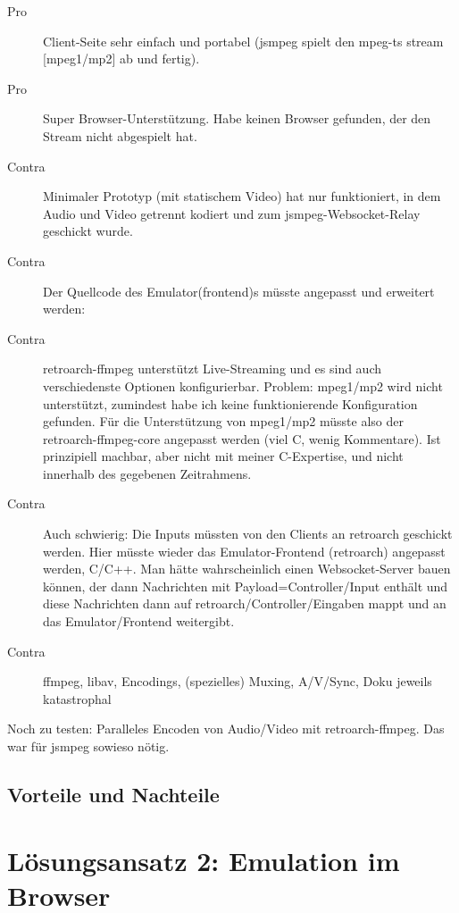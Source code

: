 \begin{description}
    \item [Pro] Client-Seite sehr einfach und portabel (jsmpeg spielt den mpeg-ts stream [mpeg1/mp2] ab und fertig).
    \item [Pro] Super Browser-Unterstützung. Habe keinen Browser gefunden, der den Stream nicht abgespielt hat.
    \item [Contra]  Minimaler Prototyp (mit statischem Video) hat nur funktioniert, in dem Audio und Video getrennt kodiert und zum jsmpeg-Websocket-Relay geschickt wurde.
\item [Contra] Der Quellcode des Emulator(frontend)s müsste angepasst und erweitert werden:
    \item [Contra] retroarch-ffmpeg unterstützt Live-Streaming und es sind auch verschiedenste Optionen konfigurierbar. Problem: mpeg1/mp2 wird nicht unterstützt, zumindest habe ich keine funktionierende Konfiguration gefunden. Für die Unterstützung von mpeg1/mp2 müsste also der retroarch-ffmpeg-core angepasst werden (viel C, wenig Kommentare). Ist prinzipiell machbar, aber nicht mit meiner C-Expertise, und nicht innerhalb des gegebenen Zeitrahmens.
    \item [Contra] Auch schwierig: Die Inputs müssten von den Clients an retroarch geschickt werden. Hier müsste wieder das Emulator-Frontend (retroarch) angepasst werden, C/C++. Man hätte wahrscheinlich einen Websocket-Server bauen können, der dann Nachrichten mit Payload=Controller\-/Input enthält und diese Nachrichten dann auf retroarch\-/Controller\-/Eingaben mappt und an das Emulator\-/Frontend weitergibt.
    \item [Contra] ffmpeg, libav, Encodings, (spezielles) Muxing, \mbox{A/V\-/Sync}, Doku jeweils katastrophal
\end{description}

Noch zu testen: Paralleles Encoden von Audio/Video mit retroarch-ffmpeg.
Das war für jsmpeg sowieso nötig.

\subsection{Vorteile und Nachteile}\label{vorteile-und-nachteile}

\section{Lösungsansatz 2: Emulation im
Browser}\label{luxf6sungsansatz-2-emulation-im-browser}

